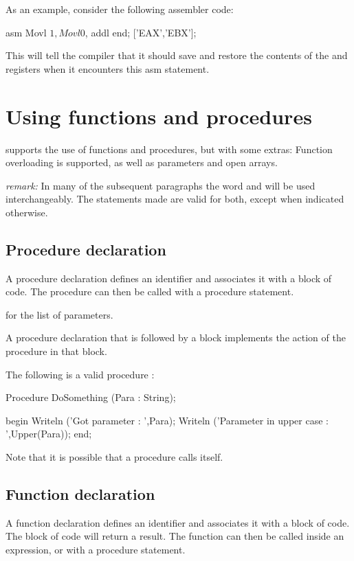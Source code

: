 \documentclass{report}
\begin{document}
As an example, consider the following assembler code:

\begin{listing}
asm
  Movl $1,%
  Movl $0,%
  addl %
end; ['EAX','EBX'];
\end{listing}
This will tell the compiler that it should save and restore the contents of 
the  and  registers when it encounters this asm statement.

\chapter{Using functions and procedures}
\label{ch:Procedures}

\fpc supports the use of functions and procedures, but with some extras:
Function overloading is supported, as well as  parameters and
open arrays.

{\em remark:} In many of the subsequent paragraphs the word  
and  will be used interchangeably. The statements made are
valid for both, except when indicated otherwise.

\section{Procedure declaration}

A procedure declaration defines an identifier and associates it with a
block of code. The procedure can then be called with a procedure statement.



 for the list of parameters.

A procedure declaration that is followed by a block implements the action of
the procedure in that block.

The following is a valid procedure : 

\begin{listing}
Procedure DoSomething (Para : String);

begin
  Writeln ('Got parameter : ',Para);
  Writeln ('Parameter in upper case : ',Upper(Para));
end;
\end{listing}

Note that it is possible that a procedure calls itself.

\section{Function declaration}
A function declaration defines an identifier and associates it with a
block of code. The block of code will return a result.  
The function can then be called inside an expression, or with a procedure 
statement. 
\end{document}
